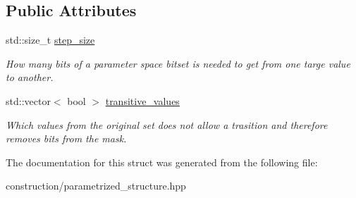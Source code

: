 \subsection*{\-Public \-Attributes}
\begin{DoxyCompactItemize}
\item 
\hypertarget{structParTransitionion_a9855b275a397fd29b91ac6b353a648b8}{std\-::size\-\_\-t \hyperlink{structParTransitionion_a9855b275a397fd29b91ac6b353a648b8}{step\-\_\-size}}\label{structParTransitionion_a9855b275a397fd29b91ac6b353a648b8}

\begin{DoxyCompactList}\small\item\em \-How many bits of a parameter space bitset is needed to get from one targe value to another. \end{DoxyCompactList}\item 
\hypertarget{structParTransitionion_a2ec3aaad7a34245ac07c52523697a584}{std\-::vector$<$ bool $>$ \hyperlink{structParTransitionion_a2ec3aaad7a34245ac07c52523697a584}{transitive\-\_\-values}}\label{structParTransitionion_a2ec3aaad7a34245ac07c52523697a584}

\begin{DoxyCompactList}\small\item\em \-Which values from the original set does not allow a trasition and therefore removes bits from the mask. \end{DoxyCompactList}\end{DoxyCompactItemize}


\-The documentation for this struct was generated from the following file\-:\begin{DoxyCompactItemize}
\item 
construction/parametrized\-\_\-structure.\-hpp\end{DoxyCompactItemize}
